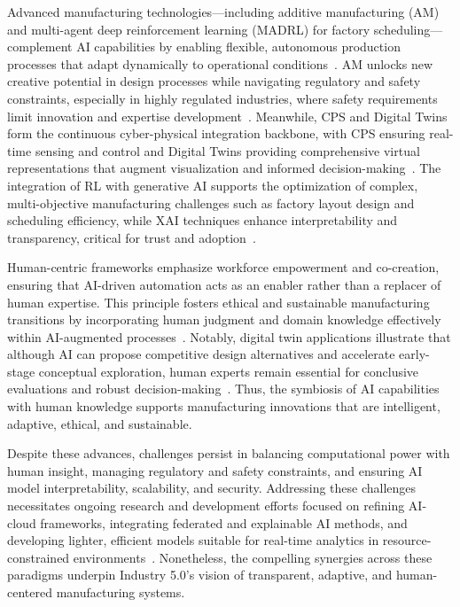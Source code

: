 \documentclass[sigconf]{acmart}
\begin{document}
Advanced manufacturing technologies—including additive manufacturing (AM) and multi-agent deep reinforcement learning (MADRL) for factory scheduling—complement AI capabilities by enabling flexible, autonomous production processes that adapt dynamically to operational conditions~\cite{ref16,ref23}. AM unlocks new creative potential in design processes while navigating regulatory and safety constraints, especially in highly regulated industries, where safety requirements limit innovation and expertise development~\cite{ref16}. Meanwhile, CPS and Digital Twins form the continuous cyber-physical integration backbone, with CPS ensuring real-time sensing and control and Digital Twins providing comprehensive virtual representations that augment visualization and informed decision-making~\cite{ref23}. The integration of RL with generative AI supports the optimization of complex, multi-objective manufacturing challenges such as factory layout design and scheduling efficiency, while XAI techniques enhance interpretability and transparency, critical for trust and adoption~\cite{ref12}.

Human-centric frameworks emphasize workforce empowerment and co-creation, ensuring that AI-driven automation acts as an enabler rather than a replacer of human expertise. This principle fosters ethical and sustainable manufacturing transitions by incorporating human judgment and domain knowledge effectively within AI-augmented processes~\cite{ref2}. Notably, digital twin applications illustrate that although AI can propose competitive design alternatives and accelerate early-stage conceptual exploration, human experts remain essential for conclusive evaluations and robust decision-making~\cite{ref2}. Thus, the symbiosis of AI capabilities with human knowledge supports manufacturing innovations that are intelligent, adaptive, ethical, and sustainable.

Despite these advances, challenges persist in balancing computational power with human insight, managing regulatory and safety constraints, and ensuring AI model interpretability, scalability, and security. Addressing these challenges necessitates ongoing research and development efforts focused on refining AI-cloud frameworks, integrating federated and explainable AI methods, and developing lighter, efficient models suitable for real-time analytics in resource-constrained environments~\cite{ref12}. Nonetheless, the compelling synergies across these paradigms underpin Industry 5.0’s vision of transparent, adaptive, and human-centered manufacturing systems.
\end{document}
